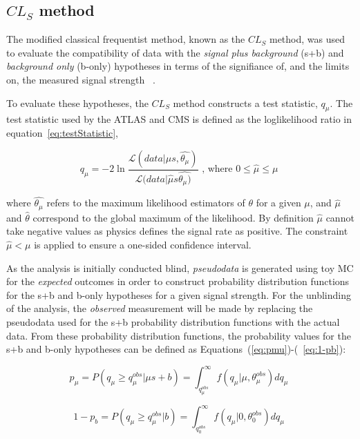 \subsection{$CL_{S}$ method}\label{subsec:CLsMethod}
The modified classical frequentist method, known as the $CL_{S}$ method, was used to evaluate the compatibility of data with the \emph{signal plus background} (s+b) and \emph{background only} (b-only) hypotheses in terms of the signifiance of, and the limits on, the measured signal strength ~\cite{AsymptoticFormulae}.

To evaluate these hypotheses, the $CL_{S}$ method constructs a test statistic, $q_{\mu}$.
The test statistic used by the ATLAS and CMS is defined as the loglikelihood ratio in equation~\ref{eq:testStatistic},

\begin{equation}
q_{\mu} =  -2 \ln \frac{ \mathcal{L}(data | \mu s , \hat{\theta_{\mu}})} { \mathcal{L}(data | \hat{\mu} s \hat{\theta_{\mu})  }} \textrm{ , where } 0 \leq \hat{\mu} \leq \mu \;
\label{eq:testStatistic}
\end{equation}

where $\hat{\theta_{\mu}}$ refers to the maximum likelihood estimators of $\theta$ for a given $\mu$, and 
$\hat{\mu}$ and $\hat{\theta}$ correspond to the global maximum of the likelihood. 
By definition $\hat{\mu}$ cannot take negative values as physics defines the signal rate as positive. 
The constraint $\hat{\mu} < \mu$ is applied to ensure a one-sided confidence interval.

As the analysis is initially conducted blind, \emph{pseudodata} is generated using toy MC for the \emph{expected} outcomes in order to construct probability distribution functions for the s+b and b-only hypotheses for a given signal strength.
For the unblinding of the analysis, the \emph{observed} measurement will be made by replacing the pseudodata used for the s+b probability distribution functions with the actual data.
From these probability distribution functions, the probability values for the s+b and b-only hypotheses can be defined as Equations~(\ref{eq:pmu})-(~\ref{eq:1-pb}):

\begin{equation}
p_{\mu} = P ( q_{\mu} \geq  q_{\mu}^{obs} | \mu s + b ) = \int^{\infty}_{q_{\mu}^{obs}} f ( q_{\mu} | \mu , \theta_{\mu}^{obs} ) dq_{\mu} \;
\label{eq:pmu}
\end{equation}

\begin{equation}
1 - p_{b} = P ( q_{\mu} \geq  q_{\mu}^{obs} | b ) = \int^{\infty}_{q_{0}^{obs}} f ( q_{\mu} | 0 , \theta_{0}^{obs} ) dq_{\mu} \;
\label{eq:1-pb}
\end{equation}

